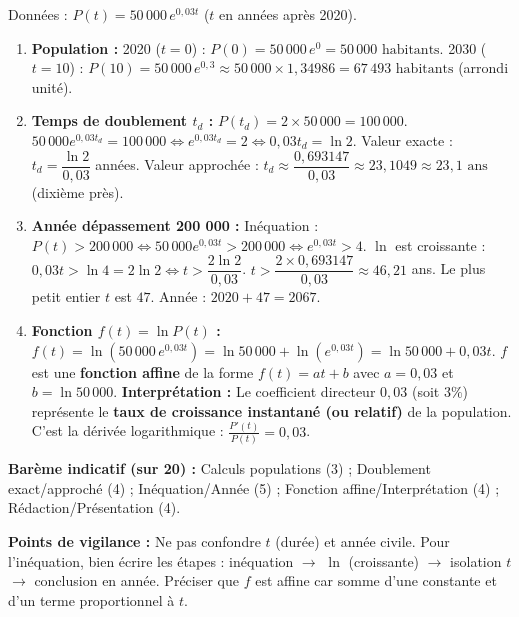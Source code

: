 \documentclass[11pt]{article}
\begin{document}
\begin{corrige}
Données : $P(t) = 50\,000 \, e^{0,03t}$ ($t$ en années après 2020).
\begin{enumerate}
    \item \textbf{Population :}
    2020 ($t=0$) : $P(0) = 50\,000 \, e^0 = \boxed{50\,000 \text{ habitants}}$.
    2030 ($t=10$) : $P(10) = 50\,000 \, e^{0,3} \approx 50\,000 \times 1,34986 = \boxed{67\,493 \text{ habitants}}$ (arrondi unité).
    \item \textbf{Temps de doublement $t_d$ :}
    $P(t_d) = 2 \times 50\,000 = 100\,000$.
    $50\,000 e^{0,03 t_d} = 100\,000 \iff e^{0,03 t_d} = 2 \iff 0,03 t_d = \ln 2$.
    Valeur exacte : $\boxed{t_d = \dfrac{\ln 2}{0,03}}$ années.
    Valeur approchée : $t_d \approx \dfrac{0,693147}{0,03} \approx 23,1049 \approx \boxed{23,1 \text{ ans}}$ (dixième près).
    \item \textbf{Année dépassement 200 000 :}
    Inéquation : $P(t) > 200\,000 \iff 50\,000 e^{0,03t} > 200\,000 \iff e^{0,03t} > 4$.
    $\ln$ est croissante : $0,03t > \ln 4 = 2\ln 2 \iff t > \dfrac{2\ln 2}{0,03}$.
    $t > \dfrac{2 \times 0,693147}{0,03} \approx 46,21$ ans.
    Le plus petit entier $t$ est $47$.
    Année : $2020 + 47 = \boxed{2067}$.
    \item \textbf{Fonction $f(t) = \ln P(t)$ :}
    $f(t) = \ln(50\,000 \, e^{0,03t}) = \ln 50\,000 + \ln(e^{0,03t}) = \ln 50\,000 + 0,03t$.
    $f$ est une \textbf{fonction affine} de la forme $f(t) = at + b$ avec $a = 0,03$ et $b = \ln 50\,000$.
    \textbf{Interprétation :} Le coefficient directeur $0,03$ (soit $3\%$) représente le \textbf{taux de croissance instantané (ou relatif)} de la population. C'est la dérivée logarithmique : $\frac{P'(t)}{P(t)} = 0,03$.
\end{enumerate}
\par\medskip
\textbf{Barème indicatif (sur 20) :} Calculs populations (3) ; Doublement exact/approché (4) ; Inéquation/Année (5) ; Fonction affine/Interprétation (4) ; Rédaction/Présentation (4).
\par\textbf{Points de vigilance :} Ne pas confondre $t$ (durée) et année civile. Pour l'inéquation, bien écrire les étapes : inéquation $\to$ $\ln$ (croissante) $\to$ isolation $t$ $\to$ conclusion en année. Préciser que $f$ est affine car somme d'une constante et d'un terme proportionnel à $t$.
\end{corrige}
\end{document}
